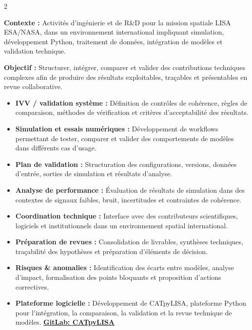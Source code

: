 \documentclass[8pt,a4paper,ragged2e,withhyper]{altacv}
\begin{document}
\begin{paracol}{2}
\divider


\textbf{Contexte :} Activités d’ingénierie et de R\&D pour la mission spatiale LISA ESA/NASA, dans un environnement international impliquant simulation, développement Python, traitement de données, intégration de modèles et validation technique.

\textbf{Objectif :} Structurer, intégrer, comparer et valider des contributions techniques complexes afin de produire des résultats exploitables, traçables et présentables en revue collaborative.

\begin{itemize}
  \item \textbf{IVV / validation système :} Définition de contrôles de cohérence, règles de comparaison, méthodes de vérification et critères d’acceptabilité des résultats.
  \item \textbf{Simulation et essais numériques :} Développement de workflows permettant de tester, comparer et valider des comportements de modèles dans différents cas d’usage.
  \item \textbf{Plan de validation :} Structuration des configurations, versions, données d’entrée, sorties de simulation et résultats d’analyse.
  \item \textbf{Analyse de performance :} Évaluation de résultats de simulation dans des contextes de signaux faibles, bruit, incertitudes et contraintes de cohérence.
  \item \textbf{Coordination technique :} Interface avec des contributeurs scientifiques, logiciels et institutionnels dans un environnement spatial international.
  \item \textbf{Préparation de revues :} Consolidation de livrables, synthèses techniques, traçabilité des hypothèses et préparation d’éléments de décision.
  \item \textbf{Risques \& anomalies :} Identification des écarts entre modèles, analyse d’impact, formalisation des points bloquants et proposition d’actions correctives.
  \item \textbf{Plateforme logicielle :} Développement de CATpyLISA, plateforme Python pour l’intégration, la comparaison, la validation et la revue technique de modèles.
  \textcolor{DarkPastelRed}{\href{https://gitlab.oca.eu/gboileau/lisa_l3_tools}{\bf GitLab: CATpyLISA}}
\end{itemize}


\end{paracol}
\end{document}
